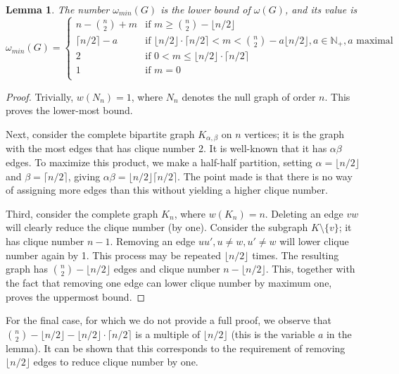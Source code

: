 \documentclass{cslthse-msc}
\newtheorem{lemma}{Lemma}
\begin{document}
\begin{lemma}\label{lemma1}
The number $\omega_{min}(G)$ is the lower bound of $\omega(G)$, and its value is
\[
\omega_{min}(G) = 
\begin{cases}
	  n - \binom{n}{2} + m & \text{if } m \geq \binom{n}{2} - \lfloor n/2 \rfloor \\
	  \lceil n / 2 \rceil - a & \text{if }  \lfloor n / 2 \rfloor \cdot \lceil n / 2 \rceil < m < \binom{n}{2} - a \lfloor n/2 \rfloor, a \in \mathbb{N}_+, a \text{ maximal} \\
	  2 & \text{if } 0 < m \leq \lfloor n / 2 \rfloor \cdot \lceil n / 2 \rceil \\
	  1 & \text{if } m = 0 \\
\end{cases}
\]
\end{lemma}


\begin{proof}
 Trivially, $w(N_n) = 1$, where $N_n$ denotes the null graph of order $n$. This proves the lower-most bound.
 
 Next, consider the complete bipartite graph $K_{\alpha,\beta}$ on $n$ vertices; it is the graph with the most edges that has clique number 2. It is well-known that it has $\alpha \beta$ edges. To maximize this product, we make a half-half partition, setting $\alpha = \lfloor n / 2 \rfloor$ and $\beta = \lceil n / 2 \rceil$, giving $\alpha \beta = \lfloor n / 2 \rfloor \lceil n / 2 \rceil$. The point made is that there is no way of assigning more edges than this without yielding a higher clique number.
 
 Third, consider the complete graph $K_n$, where $w(K_n) = n$. Deleting an edge $vw$ will clearly reduce the clique number (by one). Consider the subgraph $K \setminus \{v\}$; it has clique number $n - 1$. Removing an edge $uu', u \neq w, u' \neq w$ will lower clique number again by 1. This process may be repeated $\lfloor n / 2 \rfloor$ times. The resulting graph has $\binom{n}{2} - \lfloor n/2 \rfloor$ edges and clique number $n - \lfloor n/2 \rfloor$. This, together with the fact that removing one edge can lower clique number by maximum one, proves the uppermost bound. 
\end{proof}
For the final case, for which we do not provide a full proof, we observe that $\binom{n}{2} - \lfloor n/2 \rfloor - \lfloor n / 2 \rfloor \cdot \lceil n / 2 \rceil$ is a multiple of $\lfloor n/2 \rfloor$ (this is the variable $a$ in the lemma). It can be shown that this corresponds to the requirement of removing $\lfloor n/2 \rfloor$ edges to reduce clique number by one.
\end{document}
